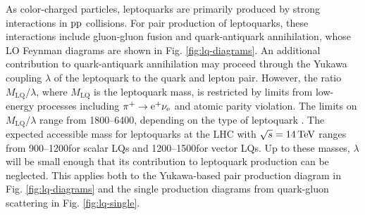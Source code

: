 \documentclass[12pt]{thesis}  %
\newcommand{\Pe}{\ensuremath{\cmsSymbolFace{e}}\xspace}
\newcommand{\Pp}{\ensuremath{\cmsSymbolFace{p}}\xspace}
\newcommand{\MLQ}{\ensuremath{M_{\text{LQ}}}\xspace}
\begin{document}
As color-charged particles, leptoquarks are primarily produced by strong interactions in $\Pp\Pp$ collisions. For pair production of leptoquarks, these interactions include gluon-gluon fusion and quark-antiquark annihilation, whose LO Feynman diagrams are shown in Fig. \ref{fig:lq-diagrams}. An additional contribution to quark-antiquark annihilation may proceed through the Yukawa coupling $\lambda$ of the leptoquark to the quark and lepton pair. However, the ratio $\MLQ/\lambda$, where $\MLQ$ is the leptoquark mass, is restricted by limits from low-energy processes including $\pi^{+} \rightarrow \Pe^{+} \nu_{\Pe}$ and atomic parity violation. The limits on $\MLQ/\lambda$ range from 1800--6400\GeVcc, depending on the type of leptoquark \cite{Leurer:1993em, MuchAdo, LQreview}. The expected accessible mass for leptoquarks at the LHC with $\sqrt{s}=14\,\text{Te\hspace{-.08em}V}$ ranges from 900--1200\GeVcc for scalar LQs and 1200--1500\GeVcc for vector LQs\cite{LQPairHad}. Up to these masses, $\lambda$ will be small enough that its contribution to leptoquark production can be neglected. This applies both to the Yukawa-based pair production diagram in Fig. \ref{fig:lq-diagrams} and the single production diagrams from quark-gluon scattering in Fig. \ref{fig:lq-single}.
\end{document}
